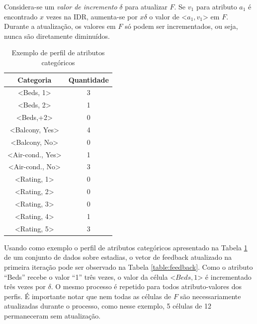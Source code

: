 Considera-se um {\em valor de incremento} $\delta$ para atualizar $F$. Se $v_1$ para atributo $a_1$ é encontrado $x$ vezes na IDR, aumenta-se por $x\delta$ o valor de \textless{}$a_1, v_1$\textgreater{} em $F$. Durante a atualização, os valores em $F$ só podem ser incrementados, ou seja, nunca são diretamente diminuídos.

\begin{table}[!h]
	\centering
	\begin{tabular}{|c|c|}
	\hline
	\textbf{Categoria}                      & \textbf{Quantidade} \\ \hline
	\textless{}Beds, 1\textgreater{}        & 3                   \\ \hline
	\textless{}Beds, 2\textgreater{}        & 1                   \\ \hline
	\textless{}Beds,+2\textgreater{}        & 0                   \\ \hline
	\textless{}Balcony, Yes\textgreater{}   & 4                   \\ \hline
	\textless{}Balcony, No\textgreater{}    & 0                   \\ \hline
	\textless{}Air-cond., Yes\textgreater{} & 1                   \\ \hline
	\textless{}Air-cond., No\textgreater{}  & 3                   \\ \hline
	\textless{}Rating, 1\textgreater{}      & 0                   \\ \hline
	\textless{}Rating, 2\textgreater{}      & 0                   \\ \hline
	\textless{}Rating, 3\textgreater{}      & 0                   \\ \hline
	\textless{}Rating, 4\textgreater{}      & 1                   \\ \hline
	\textless{}Rating, 5\textgreater{}      & 3                   \\ \hline
	\end{tabular}
	\caption{Exemplo de perfil de atributos categóricos}
	\label{table:attribs}
\end{table}

Usando como exemplo o perfil de atributos categóricos apresentado na Tabela \ref{table:attribs} de um conjunto de dados sobre estadias, o vetor de feedback atualizado na primeira iteração pode ser observado na Tabela \ref{table:feedback}. Como o atributo ``Beds'' recebe o valor ``1'' três vezes, o valor da célula \textless{}$Beds, 1$\textgreater{} é incrementado três vezes por $\delta$. O mesmo processo é repetido para todos atributo-valores dos perfis. É importante notar que nem todas as células de $F$ são necessariamente atualizadas durante o processo, como nesse exemplo, 5 células de 12 permaneceram sem atualização.

